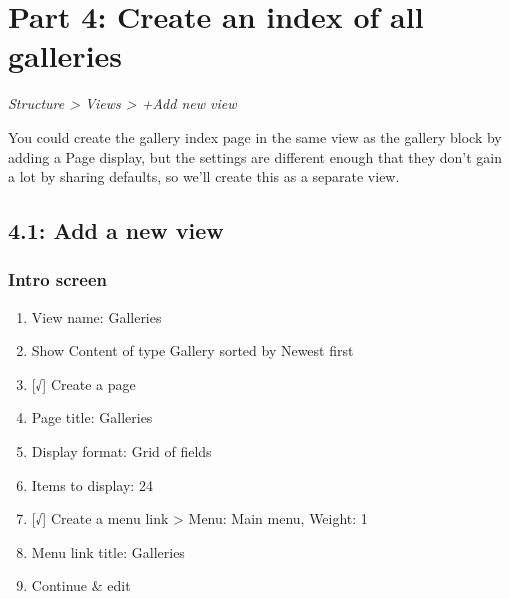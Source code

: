 \documentclass[letterpaper,10pt,english]{sphinxmanual}
\begin{document}
\section{Part 4: Create an index of all galleries}
\label{slides:part-4-create-an-index-of-all-galleries}
\emph{Structure \textgreater{} Views \textgreater{} +Add new view}

You could create the gallery index page in the same view as the gallery block by adding a Page display, but the settings are different enough that they don’t gain a lot by sharing defaults, so we’ll create this as a separate view.


\subsection{4.1: Add a new view}
\label{slides:add-a-new-view}

\subsubsection{Intro screen}
\label{slides:intro-screen}\begin{enumerate}
\item {} 
View name: Galleries

\item {} 
Show Content of type Gallery sorted by Newest first

\item {} 
{[}√{]}  Create a page

\item {} 
Page title: Galleries

\item {} 
Display format: Grid of fields

\item {} 
Items to display: 24

\item {} 
{[}√{]}  Create a menu link \textgreater{} Menu: Main menu, Weight: 1

\item {} 
Menu link title: Galleries

\item {} 
Continue \& edit

\end{enumerate}
\end{document}
